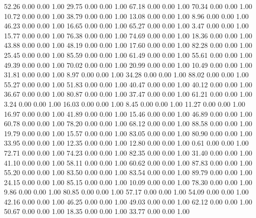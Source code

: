    52.26   0.00   0.00   1.00
   29.75   0.00   0.00   1.00
   67.18   0.00   0.00   1.00
   70.34   0.00   0.00   1.00
   10.72   0.00   0.00   1.00
   38.79   0.00   0.00   1.00
   13.08   0.00   0.00   1.00
    8.96   0.00   0.00   1.00
   46.23   0.00   0.00   1.00
   16.65   0.00   0.00   1.00
   65.27   0.00   0.00   1.00
    3.47   0.00   0.00   1.00
   15.77   0.00   0.00   1.00
   76.38   0.00   0.00   1.00
   74.69   0.00   0.00   1.00
   18.36   0.00   0.00   1.00
   43.88   0.00   0.00   1.00
   48.19   0.00   0.00   1.00
   17.60   0.00   0.00   1.00
   82.28   0.00   0.00   1.00
   25.45   0.00   0.00   1.00
   85.59   0.00   0.00   1.00
   61.49   0.00   0.00   1.00
   55.61   0.00   0.00   1.00
   49.39   0.00   0.00   1.00
   70.02   0.00   0.00   1.00
   20.99   0.00   0.00   1.00
   10.49   0.00   0.00   1.00
   31.81   0.00   0.00   1.00
    8.97   0.00   0.00   1.00
   34.28   0.00   0.00   1.00
   88.02   0.00   0.00   1.00
   55.27   0.00   0.00   1.00
   51.83   0.00   0.00   1.00
   40.47   0.00   0.00   1.00
   40.12   0.00   0.00   1.00
   36.67   0.00   0.00   1.00
   80.87   0.00   0.00   1.00
   37.47   0.00   0.00   1.00
   61.21   0.00   0.00   1.00
    3.24   0.00   0.00   1.00
   16.03   0.00   0.00   1.00
    8.45   0.00   0.00   1.00
   11.27   0.00   0.00   1.00
   16.97   0.00   0.00   1.00
   41.89   0.00   0.00   1.00
   15.46   0.00   0.00   1.00
   46.89   0.00   0.00   1.00
   60.78   0.00   0.00   1.00
   78.20   0.00   0.00   1.00
   68.12   0.00   0.00   1.00
   88.58   0.00   0.00   1.00
   19.79   0.00   0.00   1.00
   15.57   0.00   0.00   1.00
   83.05   0.00   0.00   1.00
   80.90   0.00   0.00   1.00
   33.95   0.00   0.00   1.00
   12.35   0.00   0.00   1.00
   12.80   0.00   0.00   1.00
    0.61   0.00   0.00   1.00
   72.71   0.00   0.00   1.00
   74.23   0.00   0.00   1.00
   82.35   0.00   0.00   1.00
   31.40   0.00   0.00   1.00
   41.10   0.00   0.00   1.00
   58.11   0.00   0.00   1.00
   60.62   0.00   0.00   1.00
   87.83   0.00   0.00   1.00
   55.20   0.00   0.00   1.00
   83.50   0.00   0.00   1.00
   83.54   0.00   0.00   1.00
   89.79   0.00   0.00   1.00
   24.15   0.00   0.00   1.00
   85.15   0.00   0.00   1.00
   10.09   0.00   0.00   1.00
   78.30   0.00   0.00   1.00
    9.86   0.00   0.00   1.00
   80.85   0.00   0.00   1.00
   57.17   0.00   0.00   1.00
   54.09   0.00   0.00   1.00
   42.16   0.00   0.00   1.00
   46.25   0.00   0.00   1.00
   49.03   0.00   0.00   1.00
   62.12   0.00   0.00   1.00
   50.67   0.00   0.00   1.00
   18.35   0.00   0.00   1.00
   33.77   0.00   0.00   1.00
